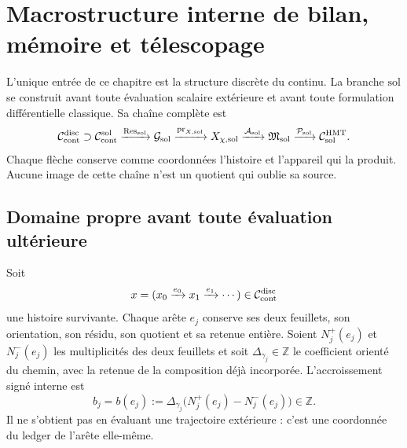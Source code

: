 \iffalse

\chapter{Macrostructure interne de bilan, mémoire et télescopage}
\label{chap:pdfv2-sol-interna}

\begin{statusbox}
L'unique entrée de ce chapitre est la structure discrète du continu.
La branche \(\mathrm{sol}\) se construit avant toute évaluation scalaire
extérieure et avant toute formulation différentielle classique. Sa chaîne
complète est
\[
 \mathcal C_{\rm cont}^{\rm disc}
 \supset\mathcal C_{\rm cont}^{\rm sol}
 \xrightarrow{\operatorname{Res}_{\rm sol}}
 \mathcal G_{\rm sol}
 \xrightarrow{\operatorname{pr}_{X,{\rm sol}}}
 X_{\chi,{\rm sol}}
 \xrightarrow{\mathcal A_{\rm sol}}
 \mathfrak M_{\rm sol}
 \xrightarrow{\mathcal P_{\rm sol}}
 \mathcal C_{\rm sol}^{\rm HMT}.
\]
Chaque flèche conserve comme coordonnées l'histoire et l'appareil qui la
produit. Aucune image de cette chaîne n'est un quotient qui oublie sa source.
\end{statusbox}

\section{Domaine propre avant toute évaluation ultérieure}
\label{sec:pdfv2-sol-dominio}

Soit
\[
 x=(x_0\xrightarrow{e_0}x_1\xrightarrow{e_1}\cdots)
 \in\mathcal C_{\rm cont}^{\rm disc}
\]
une histoire survivante. Chaque arête \(e_j\) conserve ses deux feuillets,
son orientation, son résidu, son quotient et sa retenue entière. Soient
\(N_j^+(e_j)\) et \(N_j^-(e_j)\) les multiplicités des deux feuillets et soit
\(\Delta_{\gamma_j}\in\mathbb Z\) le coefficient orienté du chemin, avec la
retenue de la composition déjà incorporée. L'accroissement signé interne est
\begin{equation}\label{eq:pdfv2-sol-b}
 b_j=b(e_j):=
 \Delta_{\gamma_j}\bigl(N_j^+(e_j)-N_j^-(e_j)\bigr)\in\mathbb Z.
\end{equation}
Il ne s'obtient pas en évaluant une trajectoire extérieure : c'est une coordonnée du
ledger de l'arête elle-même.

